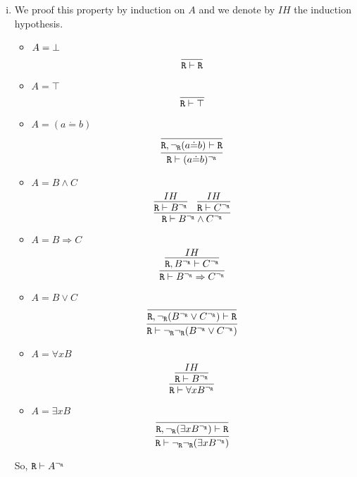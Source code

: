 \begin{enumerate}[(i)]
    \item We proof this property by induction on $A$ and we denote by $IH$ the induction hypothesis.
    \begin{itemize}
        \item $A=\bot$
            $$
                \infer{
                    \R \vdash \R
                }{
                }
            $$
        \item $A=\top$
            $$
                \infer{
                    \R \vdash \top
                }{
                }
            $$
        \item $A=(a \dot{=} b)$
            $$
                \infer{
                    \R \vdash (a \dot{=} b)^{\neg_\R}
                }{
                    \infer{
                        \R, \neg_\R(a \dot{=} b) \vdash \R
                    }{
                    }
                }
            $$
        \item $A=B\wedge C$
            $$
                \infer{
                    \R \vdash B^{\neg_\R} \wedge C^{\neg_\R}
                }{
                    \infer{
                        \R \vdash B^{\neg_\R}
                    }{
                        IH
                    }&
                    \infer{
                        \R \vdash C^{\neg_\R}
                    }{
                        IH
                    }
                }
            $$
        \item $A=B \Rightarrow C$
            $$
                \infer{
                    \R \vdash B^{\neg_\R} \Rightarrow C^{\neg_\R}
                }{
                    \infer{
                        \R, B^{\neg_\R} \vdash C^{\neg_\R}
                    }{
                        IH
                    }
                }
            $$
        \item $A=B \vee C$
            $$
                \infer{
                    \R \vdash \neg_\R\neg_\R(B^{\neg_\R} \vee C^{\neg_\R})
                }{
                    \infer{
                        \R, \neg_\R(B^{\neg_\R} \vee C^{\neg_\R}) \vdash \R
                    }{
                    }
                }
            $$
        \item $A=\forall x B$
            $$
                \infer{
                    \R \vdash \forall x B^{\neg_\R}
                }{
                    \infer{
                        \R \vdash B^{\neg_\R}
                    }{
                        IH
                    }
                }
            $$
        \item $A=\exists x B$
            $$
                \infer{
                    \R \vdash \neg_\R\neg_\R(\exists x B^{\neg_\R})
                }{
                    \infer{
                        \R, \neg_\R(\exists x B^{\neg_\R}) \vdash \R
                    }{
                    }
                }
            $$
    \end{itemize}
    So, $\texttt{R}\vdash A^{\neg_{\texttt{R}}}$
    

\end{enumerate}
